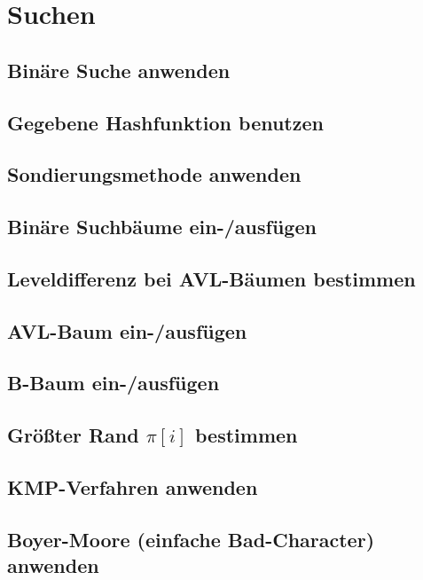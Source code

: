 \chapter{Suchen}

\section{Binäre Suche anwenden}

\section{Gegebene Hashfunktion benutzen}

\section{Sondierungsmethode anwenden}

\section{Binäre Suchbäume ein-/ausfügen}

\section{Leveldifferenz bei AVL-Bäumen bestimmen}

\section{AVL-Baum ein-/ausfügen}

\section{B-Baum ein-/ausfügen}

\section{Größter Rand \texorpdfstring{$\pi[i]$}{pi[i]} bestimmen}

\section{KMP-Verfahren anwenden}

\section{Boyer-Moore (einfache Bad-Character) anwenden}

